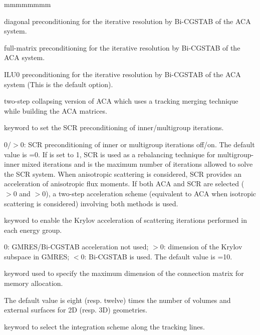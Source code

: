 \begin{ListeDeDescription}{mmmmmmmm}
\item[\moc{DIAG}] diagonal preconditioning for the iterative resolution by Bi-CGSTAB of the ACA system.

\item[\moc{FULL}] full-matrix preconditioning for the iterative resolution by Bi-CGSTAB of the ACA system.

\item[\moc{ILU0}] ILU0 preconditioning for the iterative resolution by Bi-CGSTAB of the ACA system (This is the default option).

\item[\moc{TMT}] two-step collapsing version of ACA which uses a tracking merging technique while building the ACA matrices. 

\item[\moc{SCR}] keyword to set the SCR preconditioning of inner/multigroup
iterations.\cite{gmres}

\item[\dusa{iscr}] $0$/$>0$: SCR preconditioning of inner or multigroup iterations off/on. The default value is =0. If  is set to 1, SCR is used as a rebalancing technique for multigroup-inner mixed iterations and  is the maximum number of iterations allowed to solve the SCR system. When anisotropic scattering is considered, SCR provides an acceleration of anisotropic flux moments. If both ACA and SCR are selected ($>0$ and $>0$), a two-step acceleration scheme (equivalent to ACA when isotropic scattering is considered) involving both methods is used.

\item[\moc{KRYL}] keyword to enable the Krylov acceleration of scattering iterations performed in each energy group.\cite{gmres}

\item[\dusa{ikryl}] $0$: GMRES/Bi-CGSTAB acceleration not used; $>0$: dimension of the Krylov subspace in GMRES; $<0$: Bi-CGSTAB is used.
The default value is =10.

\item[\moc{MCU}] keyword used to specify the maximum dimension of the connection matrix for memory allocation.

\item[\dusa{imcu}] The default value is eight (resp. twelve) times the number of volumes and external surfaces for 2D (resp. 3D) geometries.

\item[\moc{HDD}] keyword to select the integration scheme along the tracking lines.


\end{ListeDeDescription}
